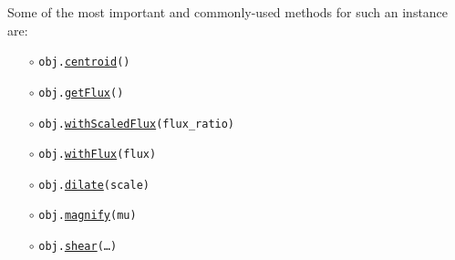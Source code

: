 \documentclass[preprint,10pt]{../../devel/modules/aastex}
\begin{document}
Some of the most important and commonly-used methods for such an
instance are:
\begin{itemize}
\item[$\circ$]
  \texttt{obj.}\href{http://galsim-developers.github.io/GalSim/classgalsim_1_1base_1_1_g_s_object.html#a08a0bb72927fce3c765a9580de656d1a}{\texttt{centroid}}\texttt{()}
\item[$\circ$]
  \texttt{obj.}\href{http://galsim-developers.github.io/GalSim/classgalsim_1_1base_1_1_g_s_object.html#a662d8ce421ecd90080bdcaaf6890aed8}{\texttt{getFlux}}\texttt{()}
\item[$\circ$]
  \texttt{obj.}\href{http://galsim-developers.github.io/GalSim/classgalsim_1_1base_1_1_g_s_object.html#a21a5b330e1c7565a2bb56258127d6149}{\texttt{withScaledFlux}}\texttt{(flux\_ratio)}
\item[$\circ$]
  \texttt{obj.}\href{http://galsim-developers.github.io/GalSim/classgalsim_1_1base_1_1_g_s_object.html#a3f12b6158381ca5ef6da8e94f701f3e5}{\texttt{withFlux}}\texttt{(flux)}
\item[$\circ$]
  \texttt{obj.}\href{http://galsim-developers.github.io/GalSim/classgalsim_1_1base_1_1_g_s_object.html#a0e80b6924c48e9708dd9e475f3b48b5f}{\texttt{dilate}}\texttt{(scale)}
\item[$\circ$]
  \texttt{obj.}\href{http://galsim-developers.github.io/GalSim/classgalsim_1_1base_1_1_g_s_object.html#aac64da7ce1c4165ba048300fede29943}{\texttt{magnify}}\texttt{(mu)}
\item[$\circ$]
  \texttt{obj.}\href{http://galsim-developers.github.io/GalSim/classgalsim_1_1base_1_1_g_s_object.html#acc3ac16f75958b4a14246e944662ce3f}{\texttt{shear}}\texttt{(\dots)}

\end{itemize}
\end{document}
